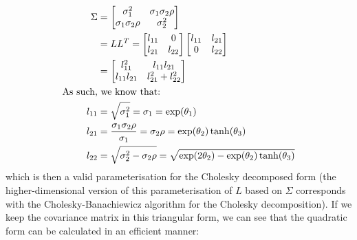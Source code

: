 \documentclass[a4paper, 12pt]{report}
\begin{document}
\begin{align}
	\Sigma &= \begin{bmatrix}
 \sigma_1^2 & \sigma_1\sigma_2\rho \\
  \sigma_1\sigma_2\rho & \sigma_2^2 \\
\end{bmatrix}\\
&= LL^T = \begin{bmatrix}
 l_{11} & 0 \\
  l_{21} & l_{22} \\
\end{bmatrix}\begin{bmatrix}
 l_{11} & l_{21} \\
  0 & l_{22} \\
\end{bmatrix}\\
&=\begin{bmatrix}
 l_{11}^2 & l_{11}l_{21} \\
  l_{11}l_{21} & l_{21}^2 + l_{22}^2 \\
\end{bmatrix}\hspace{0.5cm}\\
\textrm{As such,}&\textrm{ we know that:}\nonumber\\
	l_{11} &= \sqrt{\sigma_1^2} =\sigma_1=\exp(\theta_1)\\
	l_{21} &= \frac{\sigma_1\sigma_2\rho}{\sigma_1}=\sigma_2\rho=\exp(\theta_2)\tanh(\theta_3) \\
	l_{22} &= \sqrt{\sigma_2^2 - \sigma_2\rho} = \sqrt{\exp(2\theta_2)-\exp(\theta_2)\tanh(\theta_3)}
\end{align}
which is then a valid parameterisation for the Cholesky decomposed form  (the higher-dimensional version of this parameterisation of $L$ based on $\Sigma$ corresponds with the Cholesky-Banachiewicz algorithm for the Cholesky decomposition). If we keep the covariance matrix in this triangular form, we can see that the quadratic form can be calculated in an efficient manner:
\end{document}
